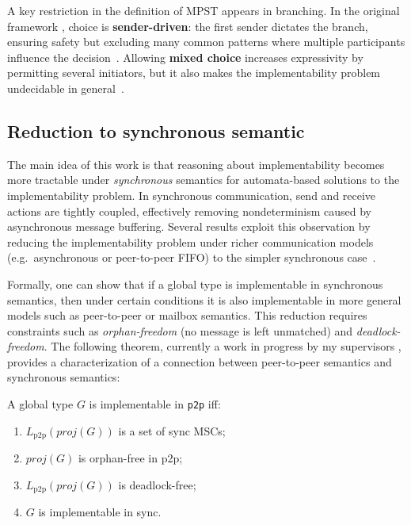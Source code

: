 A key restriction in the definition of MPST appears in branching. 
In the original framework \cite{honda2008multiparty,carbone2012structured}, 
choice is \textbf{sender-driven}: the first sender dictates the branch, 
ensuring safety but excluding many common patterns where multiple 
participants influence the decision~\cite{carbone2012structured}.  
Allowing \textbf{mixed choice} increases expressivity by permitting 
several initiators, but it also makes the implementability problem 
undecidable in general~\cite{stutz2024implementability}.  

\subsection{Reduction to synchronous semantic}
The main idea of this work is that reasoning about implementability 
becomes more tractable under \emph{synchronous} 
semantics for automata-based solutions to the implementability problem. 
In synchronous communication, send and receive actions 
are tightly coupled, effectively removing nondeterminism 
caused by asynchronous message buffering. Several results exploit this 
observation by reducing the implementability problem under richer 
communication models (e.g.\ asynchronous or peer-to-peer FIFO) to the 
simpler synchronous case~\cite{alur2005realizability,di2023partial}.

Formally, one can show that if a global type is implementable in 
synchronous semantics, then under certain conditions it is also 
implementable in more general models such as peer-to-peer or mailbox 
semantics. This reduction requires constraints such as 
\emph{orphan-freedom} (no message is left unmatched) and
\emph{deadlock-freedom}.
The following theorem, currently a work in progress by my supervisors \cite{di2025realisability}, 
provides a characterization of a connection between 
peer-to-peer semantics and synchronous semantics:

\begin{theorem}
	A global type $G$ is implementable in \verb|p2p| iff:
	\begin{enumerate}
		\item $L_{\text{p2p}}(proj(G))$ is a set of sync MSCs;
		\item $proj(G)$ is orphan-free in p2p;
		\item $L_{\text{p2p}}(proj(G))$ is deadlock-free;
		\item $G$ is implementable in sync.
	\end{enumerate}
\end{theorem}

